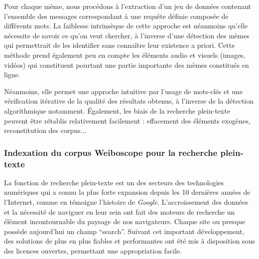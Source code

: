     Pour chaque mème, nous procédons à l{\textquoteright}extraction d{\textquoteright}un jeu de données contenant l{\textquoteright}ensemble des messages correspondant à une requête définie composée de différents mots. La faiblesse intrinsèque de cette approche est néanmoins qu'elle nécessite de savoir ce qu'on veut chercher, à l'inverse d'une détection des mèmes qui permettrait de les identifier sans connaître leur existence a priori. Cette méthode prend également peu en compte les éléments audio et visuels (images, vidéos) qui constituent pourtant une partie importante des mèmes constitués en ligne. 

    Néanmoins, elle permet une approche intuitive par l'usage de mots-clés et une vérification itérative de la qualité des résultats obtenus, à l'inverse de la détection algorithmique notamment. Également, les biais de la recherche plein-texte peuvent être rétablis relativement facilement : effacement des éléments exogènes, reconstitution des corpus... 

\subsubsection[Indexation pour la recherche plein-texte]{Indexation du corpus Weiboscope pour la recherche plein-texte}

    La fonction de recherche plein-texte est un des secteurs des technologies numériques qui a connu la plus forte expansion depuis les 10 dernières années de l'Internet, comme en témoigne l'histoire de \textit{Google}. L'accroissement des données et la nécessité de naviguer en leur sein ont fait des moteurs de recherche un élément incontournable du paysage de nos navigateurs. Chaque site ou presque possède aujourd'hui un champ ``search''. Suivant cet important développement, des solutions de plus en plus fiables et performantes ont été mis à disposition sous des licences ouvertes, permettant une appropriation facile.

